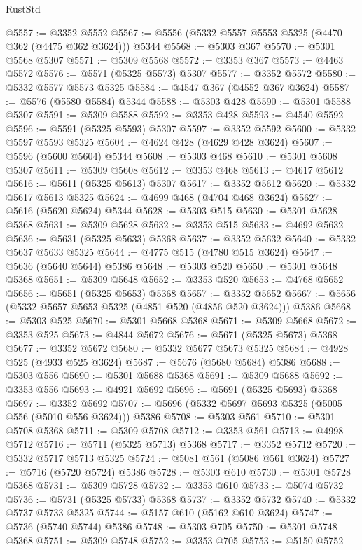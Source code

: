 \begin{lexlean}{RustStd}
\begin{coremodule}
@5557 := @3352 @5552
@5567 := @5556 (@5332 @5557 @5553 @5325 (@4470 @362 (@4475 @362 @3624))) @5344
@5568 := @5303 @367
@5570 := @5301 @5568 @5307
@5571 := @5309 @5568
@5572 := @3353 @367
@5573 := @4463 @5572
@5576 := @5571 (@5325 @5573) @5307
@5577 := @3352 @5572
@5580 := @5332 @5577 @5573 @5325
@5584 := @4547 @367 (@4552 @367 @3624)
@5587 := @5576 (@5580 @5584) @5344
@5588 := @5303 @428
@5590 := @5301 @5588 @5307
@5591 := @5309 @5588
@5592 := @3353 @428
@5593 := @4540 @5592
@5596 := @5591 (@5325 @5593) @5307
@5597 := @3352 @5592
@5600 := @5332 @5597 @5593 @5325
@5604 := @4624 @428 (@4629 @428 @3624)
@5607 := @5596 (@5600 @5604) @5344
@5608 := @5303 @468
@5610 := @5301 @5608 @5307
@5611 := @5309 @5608
@5612 := @3353 @468
@5613 := @4617 @5612
@5616 := @5611 (@5325 @5613) @5307
@5617 := @3352 @5612
@5620 := @5332 @5617 @5613 @5325
@5624 := @4699 @468 (@4704 @468 @3624)
@5627 := @5616 (@5620 @5624) @5344
@5628 := @5303 @515
@5630 := @5301 @5628 @5368
@5631 := @5309 @5628
@5632 := @3353 @515
@5633 := @4692 @5632
@5636 := @5631 (@5325 @5633) @5368
@5637 := @3352 @5632
@5640 := @5332 @5637 @5633 @5325
@5644 := @4775 @515 (@4780 @515 @3624)
@5647 := @5636 (@5640 @5644) @5386
@5648 := @5303 @520
@5650 := @5301 @5648 @5368
@5651 := @5309 @5648
@5652 := @3353 @520
@5653 := @4768 @5652
@5656 := @5651 (@5325 @5653) @5368
@5657 := @3352 @5652
@5667 := @5656 (@5332 @5657 @5653 @5325 (@4851 @520 (@4856 @520 @3624))) @5386
@5668 := @5303 @525
@5670 := @5301 @5668 @5368
@5671 := @5309 @5668
@5672 := @3353 @525
@5673 := @4844 @5672
@5676 := @5671 (@5325 @5673) @5368
@5677 := @3352 @5672
@5680 := @5332 @5677 @5673 @5325
@5684 := @4928 @525 (@4933 @525 @3624)
@5687 := @5676 (@5680 @5684) @5386
@5688 := @5303 @556
@5690 := @5301 @5688 @5368
@5691 := @5309 @5688
@5692 := @3353 @556
@5693 := @4921 @5692
@5696 := @5691 (@5325 @5693) @5368
@5697 := @3352 @5692
@5707 := @5696 (@5332 @5697 @5693 @5325 (@5005 @556 (@5010 @556 @3624))) @5386
@5708 := @5303 @561
@5710 := @5301 @5708 @5368
@5711 := @5309 @5708
@5712 := @3353 @561
@5713 := @4998 @5712
@5716 := @5711 (@5325 @5713) @5368
@5717 := @3352 @5712
@5720 := @5332 @5717 @5713 @5325
@5724 := @5081 @561 (@5086 @561 @3624)
@5727 := @5716 (@5720 @5724) @5386
@5728 := @5303 @610
@5730 := @5301 @5728 @5368
@5731 := @5309 @5728
@5732 := @3353 @610
@5733 := @5074 @5732
@5736 := @5731 (@5325 @5733) @5368
@5737 := @3352 @5732
@5740 := @5332 @5737 @5733 @5325
@5744 := @5157 @610 (@5162 @610 @3624)
@5747 := @5736 (@5740 @5744) @5386
@5748 := @5303 @705
@5750 := @5301 @5748 @5368
@5751 := @5309 @5748
@5752 := @3353 @705
@5753 := @5150 @5752

\end{coremodule}
\end{lexlean}
